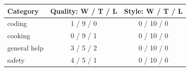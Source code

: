\small
\begin{tabular}{lcc}
\toprule
Category & Quality: W / T / L & Style: W / T / L \\
\midrule
coding & 1 / 9 / 0 & 0 / 10 / 0 \\
cooking & 0 / 9 / 1 & 0 / 10 / 0 \\
general help & 3 / 5 / 2 & 0 / 10 / 0 \\
safety & 4 / 5 / 1 & 0 / 10 / 0 \\
\bottomrule
\end{tabular}
